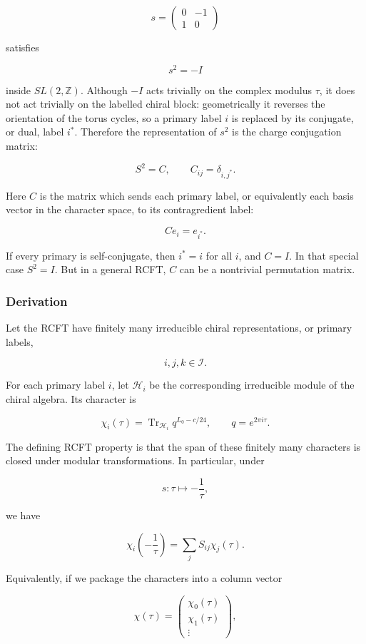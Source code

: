 \documentclass[
  10pt,
  a4paper,
  openany]{book}
\begin{document}
\[
s =
\begin{pmatrix}
0 & -1 \\
1 & 0
\end{pmatrix}
\]

satisfies

\[
s^2 = -I
\]

inside \(SL(2,\mathbb Z)\). Although \(-I\) acts trivially on the
complex modulus \(\tau\), it does not act trivially on the labelled
chiral block: geometrically it reverses the orientation of the torus
cycles, so a primary label \(i\) is replaced by its conjugate, or dual,
label \(i^*\). Therefore the representation of \(s^2\) is the charge
conjugation matrix:

\[
S^2 = C,
\qquad
C_{ij} = \delta_{i,j^*}.
\]

Here \(C\) is the matrix which sends each primary label, or equivalently
each basis vector in the character space, to its contragredient label:

\[
C e_i = e_{i^*}.
\]

If every primary is self-conjugate, then \(i^*=i\) for all \(i\), and
\(C=I\). In that special case \(S^2=I\). But in a general RCFT, \(C\)
can be a nontrivial permutation matrix.

\subsubsection{Derivation}\label{derivation-2}

Let the RCFT have finitely many irreducible chiral representations, or
primary labels,

\[
i,j,k \in \mathcal I.
\]

For each primary label \(i\), let \(\mathcal H_i\) be the corresponding
irreducible module of the chiral algebra. Its character is

\[
\chi_i(\tau)
=
\operatorname{Tr}_{\mathcal H_i}
q^{L_0-c/24},
\qquad
q=e^{2\pi i \tau}.
\]

The defining RCFT property is that the span of these finitely many
characters is closed under modular transformations. In particular, under

\[
s:\tau \mapsto -\frac{1}{\tau},
\]

we have

\[
\chi_i\left(-\frac{1}{\tau}\right)
=
\sum_j S_{ij}\chi_j(\tau).
\]

Equivalently, if we package the characters into a column vector

\[
\chi(\tau)
=
\begin{pmatrix}
\chi_0(\tau) \\
\chi_1(\tau) \\
\vdots
\end{pmatrix},
\]
\end{document}
